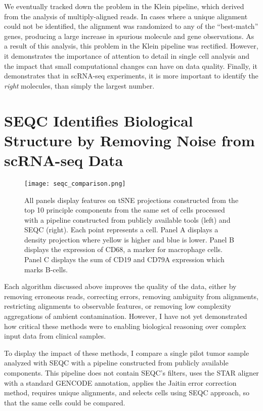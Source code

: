 We eventually tracked down the problem in the Klein pipeline, which derived from the analysis of multiply-aligned reads. In cases where a unique alignment could not be identified, the alignment was randomized to any of the ``best-match'' genes, producing a large increase in spurious molecule and gene observations. 
As a result of this analysis, this problem in the Klein pipeline was rectified. 
However, it demonstrates the importance of attention to detail in single cell analysis and the impact that small computational changes can have on data quality. 
Finally, it demonstrates that in scRNA-seq experiments, it is more important to identify the \textit{right} molecules, than simply the largest number. 

\section{SEQC Identifies Biological Structure by Removing Noise from scRNA-seq Data}

\begin{figure}
\centering
\texttt{[image: seqc\_comparison.png]}
\caption{All panels display features on tSNE projections constructed from the top 10 principle components from the same set of cells processed with a pipeline constructed from publicly available tools (left) and SEQC (right). Each point represents a cell. 
Panel A displays a density projection where yellow is higher and blue is lower. Panel B displays the expression of CD68, a marker for macrophage cells. Panel C displays the sum of CD19 and CD79A expression which marks B-cells.}

\label{fig:seqc-comparison}
\end{figure}

Each algorithm discussed above improves the quality of the data, either by removing erroneous reads, correcting errors, removing ambiguity from alignments, restricting alignments to observable features, or removing low complexity aggregations of ambient contamination. 
However, I have not yet demonstrated how critical these methods were to enabling biological reasoning over complex input data from clinical samples. 

To display the impact of these methods, I compare a single pilot tumor sample analyzed with SEQC with a pipeline constructed from publicly available components.
This pipeline does not contain SEQC's filters, uses the STAR aligner with a standard GENCODE annotation, applies the Jaitin error correction method, requires unique alignments, and selects cells using SEQC approach, so that the same cells could be compared. 

